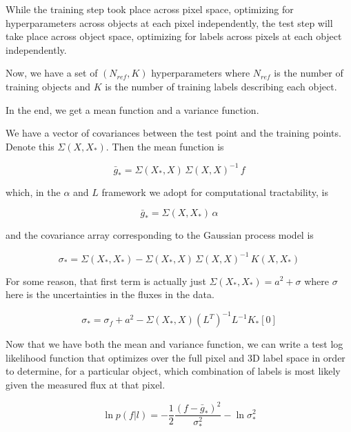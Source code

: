 \documentclass[12pt, preprint]{aastex}
\begin{document}
While the training step took place across pixel space, optimizing for 
hyperparameters across objects at each pixel independently, the test step 
will take place across object space, optimizing for labels across pixels at 
each object independently.

Now, we have a set of $(N_{ref}, K)$ hyperparameters where $N_{ref}$ is 
the number of training objects and $K$ is the number of training labels 
describing each object.


In the end, we get a mean function and a variance function. 

We have a vector of covariances between the test point and the training 
points. Denote this $\Sigma(X,X_*)$. Then the mean function is

\begin{equation}
  \bar{g}_* = \Sigma(X_*, X)\,\Sigma(X, X)^{-1}\,f
  \label{}
\end{equation}

which, in the $\alpha$ and $L$ framework we adopt for computational
tractability, is

\begin{equation}
  \bar{g}_* = \Sigma(X, X_*)\,\alpha
  \label{}
\end{equation}

and the covariance array corresponding to the Gaussian process model is

\begin{equation}
  \sigma_* = \Sigma(X_*, X_*)-\Sigma(X_*,X)\,\Sigma(X,X)^{-1}\,K(X,X_*)
  \label{}
\end{equation}

For some reason, that first term is actually just 
$\Sigma(X_*, X_*) = a^2 + \sigma$ where $\sigma$ here is the uncertainties
in the fluxes in the data. 

\begin{equation}
  \sigma_* = \sigma_f + a^2 - \Sigma(X_*,X) (L^T)^{-1}L^{-1} K_*[0]
  \label{}
\end{equation}

Now that we have both the mean and variance function, 
we can write a test log likelihood function that optimizes over the full pixel
and 3D label space in order to determine, for a particular object, which 
combination of labels is most likely given the measured flux at that pixel.

\begin{equation}
  \ln{p(f|l)} = -\frac{1}{2} \frac{(f-\bar{g}_*)^2}{\sigma_*^2} - \ln{\sigma_*^2}
  \label{}
\end{equation}
\end{document}
